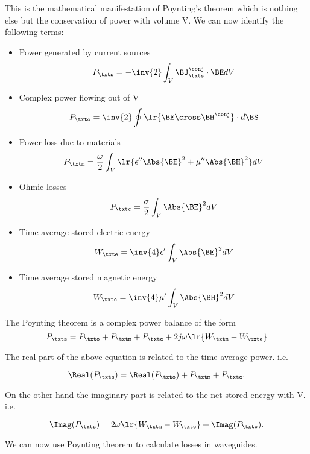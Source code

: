 This is the mathematical manifestation of Poynting's theorem which is nothing else but the conservation of power with volume V.  We can now identify the following terms:

\begin{itemize}
\item Power generated by current sources
\begin{equation}\label{eqn:uwavesLecture2:1320}
P_\txts = -\inv{2} \int_V \BJ_\txts^\conj \cdot \BE dV
\end{equation}
\item Complex power flowing out of V 
\begin{equation}\label{eqn:uwavesLecture2:1340}
P_\txto = \inv{2} \oint \lr{ \BE \cross \BH^\conj } \cdot d\BS
\end{equation}
\item Power loss due to materials 
\begin{equation}\label{eqn:uwavesLecture2:1360}
P_\txtm = \frac{\omega}{2} \int_V \lr{ \epsilon'' \Abs{\BE}^2 + \mu'' \Abs{\BH}^2 } dV
\end{equation}
\item Ohmic losses 
\begin{equation}\label{eqn:uwavesLecture2:1380}
P_\txtc = \frac{\sigma}{2} \int_V \Abs{\BE}^2 dV
\end{equation}
\item Time average stored electric energy 
\begin{equation}\label{eqn:uwavesLecture2:1400}
W_\txte = \inv{4} \epsilon' \int_V \Abs{\BE}^2 dV
\end{equation}
\item Time average stored magnetic energy 
\begin{equation}\label{eqn:uwavesLecture2:1420}
W_\txte = \inv{4} \mu' \int_V \Abs{\BH}^2 dV
\end{equation}
\end{itemize}

The Poynting theorem is a complex power balance of the form
\begin{equation}\label{eqn:uwavesLecture2:1440}
P_\txts = P_\txto + P_\txtm + P_\txtc + 2 j \omega \lr{ W_\txtm - W_\txte }
\end{equation}

The real part of the above equation is related to the time average power.  i.e.

\begin{equation}\label{eqn:uwavesLecture2:1460}
\Real(P_\txts) = \Real(P_\txto) + P_\txtm + P_\txtc.
\end{equation}

On the other hand the imaginary part is related to the net stored energy with V.  i.e.

\begin{equation}\label{eqn:uwavesLecture2:1480}
\Imag( P_\txts ) = 2 \omega \lr{ W_\txtm - W_\txte } + \Imag( P_\txto ).
\end{equation}

We can now use Poynting theorem to calculate losses in waveguides.
